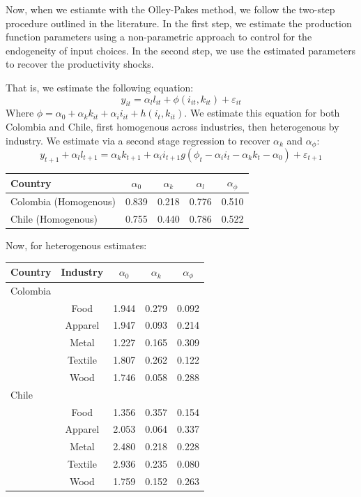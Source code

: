 \documentclass{article}
\begin{document}
Now, when we estiamte with the Olley-Pakes method, we follow the two-step procedure outlined in the literature.
In the first step, we estimate the production function parameters using a non-parametric approach to control for the endogeneity of input choices.
In the second step, we use the estimated parameters to recover the productivity shocks.

That is, we estimate the following equation:
\begin{equation}
  y_{it} = \alpha_l l_{it} + \phi(i_{it}, k_{it}) + \varepsilon_{it}
\end{equation}
Where $\phi = \alpha_0 + \alpha_k k_{it} + \alpha_i i_{it} + h(i_t, k_{it})$. We estimate this equation for both Colombia and Chile, first homogenous across industries, then heterogenous by industry.       
We estimate via a second stage regression to recover $\alpha_k$ and $\alpha_{\phi}$:
\begin{equation}
  y_{t+1} + \alpha_l l_{t+1} = \alpha_k k_{t+1} + \alpha_i i_{t+1} g(\phi_t - \alpha_i i_t - \alpha_k k_t - \alpha_0) + \varepsilon_{t+1}
\end{equation}

\begin{center}
\begin{tabular}[h]{|lcccc|}
  \hline
  \textbf{Country} & \textbf{$\alpha_0$} & \textbf{$\alpha_k$} & \textbf{$\alpha_l$} & \textbf{$\alpha_{\phi}$}\\
  \hline
  \hline
  Colombia (Homogenous) & 0.839 & 0.218 & 0.776 & 0.510 \\
  Chile (Homogenous) & 0.755 & 0.440 & 0.786 & 0.522 \\
  \hline
\end{tabular}
\end{center}

\vspace{1cm}
Now, for heterogenous estimates:
\begin{center}
\begin{tabular}[h]{|lcccc|}
  \hline
  \textbf{Country} & \textbf{Industry} & \textbf{$\alpha_0$} & \textbf{$\alpha_k$} & \textbf{$\alpha_{\phi}$} \\
  \hline
  \hline
  Colombia & & & & \\
  \hline
   & Food & 1.944 & 0.279 & 0.092 \\
   & Apparel & 1.947 & 0.093 & 0.214 \\
   & Metal & 1.227 & 0.165 & 0.309 \\
   & Textile & 1.807 & 0.262 & 0.122 \\
   & Wood & 1.746 & 0.058 & 0.288  \\
   \hline
  Chile & & & & \\
  \hline
   & Food & 1.356 & 0.357 & 0.154  \\
   & Apparel & 2.053 & 0.064 & 0.337  \\
   & Metal & 2.480 & 0.218 & 0.228  \\
   & Textile & 2.936 & 0.235 & 0.080  \\
   & Wood & 1.759 & 0.152 & 0.263  \\
   \hline
\end{tabular}
\end{center}
\end{document}
